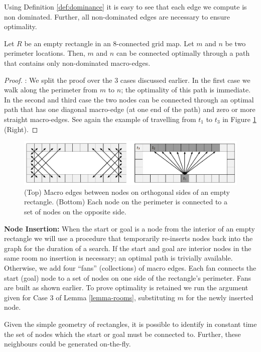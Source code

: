 \par
Using Definition \ref{def:dominance} it is easy to see that each edge we compute
is non dominated. Further, all non-dominated edges are necessary to ensure
optimality. 

\begin{lemma} \label{lemma-rooms} Let $R$ be an empty rectangle in
an 8-connected grid map. Let $m$ and $n$ be two perimeter locations.
Then, $m$ and $n$ can be connected optimally through a path that
contains only non-dominated macro-edges.
\end{lemma}

\begin{proof}:
We split the proof over the 3 cases discussed earlier.
In the first case we walk along the perimeter from $m$ to $n$; the
optimality of this path is immediate. In the second and third case 
the two nodes can be connected through an optimal path that has one diagonal macro-edge
(at one end of the path) and zero or more straight macro-edges.
See again the example of travelling from $t_1$ to $t_3$ in Figure
\ref{fig-macroedges} (Right).
\end{proof}

\begin{figure}[tb]
       \begin{center}
		   \includegraphics[width=0.97\columnwidth, trim = 10mm 10mm 10mm 0mm]
			{diagrams/macroedges_wide.png}
       \end{center}
	\vspace{-3pt}
       \caption{(Top) Macro edges between nodes on orthogonal sides of an empty
       rectangle. (Bottom) Each node on the perimeter is connected to a set of 
		nodes on the opposite side.}
       \label{fig-macroedges}
\end{figure}

\noindent
\textbf{Node Insertion:}
When the start or goal is a node from the interior of an empty rectangle we
will use a procedure that temporarily re-inserts nodes back into the 
graph for the duration of a search.
{If the start and goal are interior nodes
in the same room no insertion is necessary; an optimal path is trivially
available. } {Otherwise, we add four ``fans'' (collections) of macro edges.  Each fan connects
the start (goal) node to a set of nodes on one side of the rectangle's
perimeter.  Fans are built as shown earlier.}
To prove optimality is retained we run the argument given
for Case 3 of Lemma \ref{lemma-rooms}, substituting $m$ for the newly inserted node.
\par
Given the simple geometry of rectangles, it is possible to identify in constant
time the set of nodes which the start or goal must be connected to.  Further,
these neighbours could be generated on-the-fly.

